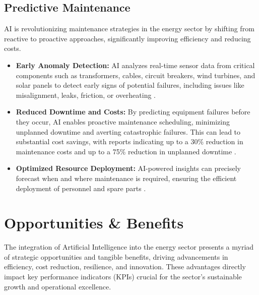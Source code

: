 \subsection{Predictive Maintenance}
AI is revolutionizing maintenance strategies in the energy sector by shifting from reactive to proactive approaches, significantly improving efficiency and reducing costs.
\begin{itemize}
    \item \textbf{Early Anomaly Detection:} AI analyzes real-time sensor data from critical components such as transformers, cables, circuit breakers, wind turbines, and solar panels to detect early signs of potential failures, including issues like misalignment, leaks, friction, or overheating \cite{Aeologic_EnergyAI, PowerTechnology_EnergyAI}.
    \item \textbf{Reduced Downtime and Costs:} By predicting equipment failures before they occur, AI enables proactive maintenance scheduling, minimizing unplanned downtime and averting catastrophic failures. This can lead to substantial cost savings, with reports indicating up to a 30\% reduction in maintenance costs and up to a 75\% reduction in unplanned downtime \cite{Zealousys_EnergyAI, PowerTechnology_EnergyAI, Xenonstack_EnergyAI}.
    \item \textbf{Optimized Resource Deployment:} AI-powered insights can precisely forecast when and where maintenance is required, ensuring the efficient deployment of personnel and spare parts \cite{Aeologic_EnergyAI}.
\end{itemize}

\section{Opportunities \& Benefits}

The integration of Artificial Intelligence into the energy sector presents a myriad of strategic opportunities and tangible benefits, driving advancements in efficiency, cost reduction, resilience, and innovation. These advantages directly impact key performance indicators (KPIs) crucial for the sector's sustainable growth and operational excellence.

